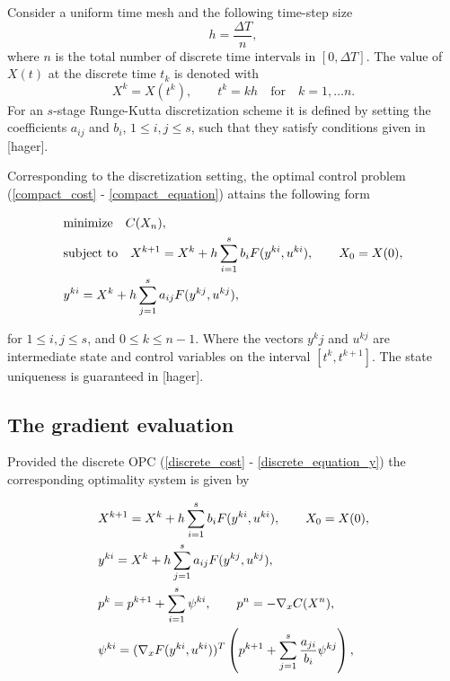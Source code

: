 \documentclass[a4paper,10pt, english]{article}
\newcommand{\D}{\displaystyle}
\begin{document}
  Consider a uniform time mesh and the following time-step size
 \begin{equation}
   h = \frac{\Delta T}{n},
   \label{h}
 \end{equation}
 where $n$ is the total number of discrete time intervals in $[0, \Delta T]$.  The value of $X(t)$ at the discrete time $t_k$ is denoted with
 $$
 X^k = X(t^k), \qquad t^k = kh \quad\mbox{for} \quad k = 1, \dots n.
 $$
 For an $s$-stage Runge-Kutta discretization scheme it is defined by setting the coefficients $a_{ij}$ and
 $b_{i}$, $1\leq i, j\leq s$, such that they satisfy conditions given in [hager]. 
 
 Corresponding to the discretization setting, the optimal control problem (\ref{compact_cost} -  \ref{compact_equation})  attains the following form
 
 \begin{align}
  \D
  & \mbox{minimize}\quad C(X_n), \label{discrete_cost}\\
  & \mbox{subject to} \quad X^{k+1}  = X^k + h\sum_{i=1}^{s}b_iF(y^{ki}, u^{ki}), \qquad X_0 = X(0), \label{discrete_equation_x}\\
  & y^{ki} = X^k + h\sum_{j=1}^{s}a_{ij}F(y^{kj}, u^{kj}),\label{discrete_equation_y}
  \end{align}
 
 for $1\leq i, j\leq s$, and $0\leq k\leq n-1$.
 Where the vectors $y^kj$ and $u^{kj}$ are intermediate state and control variables on the interval $[t^k, t^{k+1}]$. The state uniqueness is guaranteed in [hager]. 
 
 
 

\newpage
\subsection{The gradient evaluation}
Provided the discrete OPC (\ref{discrete_cost} - \ref{discrete_equation_y}) the corresponding  optimality system  is given by

  \begin{align}
   \D
    & X^{k+1}  = X^k + h\sum_{i=1}^{s}b_iF(y^{ki}, u^{ki}), \qquad X_0 = X(0),   \label{os_state_x}\\
 	& y^{ki} = X^k + h\sum_{j=1}^{s}a_{ij}F(y^{kj}, u^{kj}),   \label{os_state_y}\\
 	& p^k = p^{k+1} + \sum_{i=1}^{s}\psi^{ki}, \qquad p^n = - \nabla_xC(X^n),  \label{os_adjoint_p}\\
 	& \psi^{ki} = (\nabla_x F(y^{ki}, u^{ki}))^{T} \left( p^{k+1} + \sum_{j=1}^{s} \frac{a_{ji}}{b_i}\psi^{kj}\right), \label{os_adjoint_psi} 
   \end{align}
\end{document}
